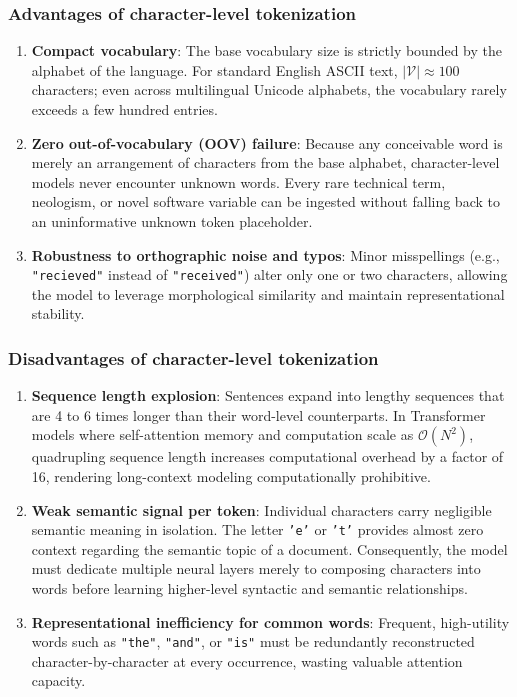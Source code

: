 \documentclass[../../../main.tex]{subfiles}
\begin{document}
\subsubsection{Advantages of character-level tokenization}
\begin{enumerate}
    \item \textbf{Compact vocabulary}: The base vocabulary size is strictly bounded by the alphabet of the language. For standard English ASCII text, $|\mathcal{V}| \approx 100$ characters; even across multilingual Unicode alphabets, the vocabulary rarely exceeds a few hundred entries.
    \item \textbf{Zero out-of-vocabulary (OOV) failure}: Because any conceivable word is merely an arrangement of characters from the base alphabet, character-level models never encounter unknown words. Every rare technical term, neologism, or novel software variable can be ingested without falling back to an uninformative unknown token placeholder.
    \item \textbf{Robustness to orthographic noise and typos}: Minor misspellings (e.g., \texttt{"recieved"} instead of \texttt{"received"}) alter only one or two characters, allowing the model to leverage morphological similarity and maintain representational stability.
\end{enumerate}

\subsubsection{Disadvantages of character-level tokenization}
\begin{enumerate}
    \item \textbf{Sequence length explosion}: Sentences expand into lengthy sequences that are 4 to 6 times longer than their word-level counterparts. In Transformer models where self-attention memory and computation scale as $\mathcal{O}(N^2)$, quadrupling sequence length increases computational overhead by a factor of 16, rendering long-context modeling computationally prohibitive.
    \item \textbf{Weak semantic signal per token}: Individual characters carry negligible semantic meaning in isolation. The letter \texttt{'e'} or \texttt{'t'} provides almost zero context regarding the semantic topic of a document. Consequently, the model must dedicate multiple neural layers merely to composing characters into words before learning higher-level syntactic and semantic relationships.
    \item \textbf{Representational inefficiency for common words}: Frequent, high-utility words such as \texttt{"the"}, \texttt{"and"}, or \texttt{"is"} must be redundantly reconstructed character-by-character at every occurrence, wasting valuable attention capacity.
\end{enumerate}
\end{document}
